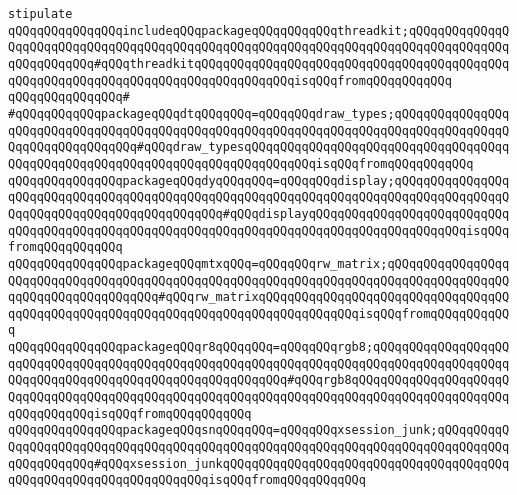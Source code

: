 \newline
\newline
\newline
\newline
\verb|stipulate|\newline
\verb|qQQqqQQqqQQqqQQqincludeqQQqpackageqQQqqQQqqQQqthreadkit;qQQqqQQqqQQqqQQqqQQqqQQqqQQqqQQqqQQqqQQqqQQqqQQqqQQqqQQqqQQqqQQqqQQqqQQqqQQqqQQqqQQqqQQqqQQqqQQq#qQQqthreadkitqQQqqQQqqQQqqQQqqQQqqQQqqQQqqQQqqQQqqQQqqQQqqQQqqQQqqQQqqQQqqQQqqQQqqQQqqQQqqQQqqQQqisqQQqfromqQQqqQQqqQQq|\newline
\verb|qQQqqQQqqQQqqQQq#|\newline
\verb|#qQQqqQQqqQQqpackageqQQqdtqQQqqQQq=qQQqqQQqdraw_types;qQQqqQQqqQQqqQQqqQQqqQQqqQQqqQQqqQQqqQQqqQQqqQQqqQQqqQQqqQQqqQQqqQQqqQQqqQQqqQQqqQQqqQQqqQQqqQQqqQQqqQQq#qQQqdraw_typesqQQqqQQqqQQqqQQqqQQqqQQqqQQqqQQqqQQqqQQqqQQqqQQqqQQqqQQqqQQqqQQqqQQqqQQqqQQqqQQqisqQQqfromqQQqqQQqqQQq|\newline
\verb|qQQqqQQqqQQqqQQqpackageqQQqdyqQQqqQQq=qQQqqQQqdisplay;qQQqqQQqqQQqqQQqqQQqqQQqqQQqqQQqqQQqqQQqqQQqqQQqqQQqqQQqqQQqqQQqqQQqqQQqqQQqqQQqqQQqqQQqqQQqqQQqqQQqqQQqqQQqqQQqqQQq#qQQqdisplayqQQqqQQqqQQqqQQqqQQqqQQqqQQqqQQqqQQqqQQqqQQqqQQqqQQqqQQqqQQqqQQqqQQqqQQqqQQqqQQqqQQqqQQqqQQqisqQQqfromqQQqqQQqqQQq|\newline
\verb|qQQqqQQqqQQqqQQqpackageqQQqmtxqQQq=qQQqqQQqrw_matrix;qQQqqQQqqQQqqQQqqQQqqQQqqQQqqQQqqQQqqQQqqQQqqQQqqQQqqQQqqQQqqQQqqQQqqQQqqQQqqQQqqQQqqQQqqQQqqQQqqQQqqQQqqQQq#qQQqrw_matrixqQQqqQQqqQQqqQQqqQQqqQQqqQQqqQQqqQQqqQQqqQQqqQQqqQQqqQQqqQQqqQQqqQQqqQQqqQQqqQQqqQQqisqQQqfromqQQqqQQqqQQq|\newline
\verb|qQQqqQQqqQQqqQQqpackageqQQqr8qQQqqQQq=qQQqqQQqrgb8;qQQqqQQqqQQqqQQqqQQqqQQqqQQqqQQqqQQqqQQqqQQqqQQqqQQqqQQqqQQqqQQqqQQqqQQqqQQqqQQqqQQqqQQqqQQqqQQqqQQqqQQqqQQqqQQqqQQqqQQqqQQqqQQq#qQQqrgb8qQQqqQQqqQQqqQQqqQQqqQQqqQQqqQQqqQQqqQQqqQQqqQQqqQQqqQQqqQQqqQQqqQQqqQQqqQQqqQQqqQQqqQQqqQQqqQQqqQQqqQQqisqQQqfromqQQqqQQqqQQq|\newline
\verb|qQQqqQQqqQQqqQQqpackageqQQqsnqQQqqQQq=qQQqqQQqxsession_junk;qQQqqQQqqQQqqQQqqQQqqQQqqQQqqQQqqQQqqQQqqQQqqQQqqQQqqQQqqQQqqQQqqQQqqQQqqQQqqQQqqQQqqQQqqQQq#qQQqxsession_junkqQQqqQQqqQQqqQQqqQQqqQQqqQQqqQQqqQQqqQQqqQQqqQQqqQQqqQQqqQQqqQQqqQQqisqQQqfromqQQqqQQqqQQq|\newline

